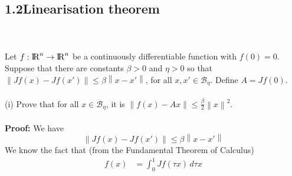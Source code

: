 \documentclass[a4paper,11pt,reqno]{amsart}
\newcommand{\R}{{\rm I\!R}}
\begin{document}
\subsection*{1.2\quad Linearisation theorem}\label{sec:q2}
\
\\ \\
Let $f:\R^n\to\R^n$ be a continuously differentiable function with $f(0)=0$. Suppose that there are constants $\beta>0$ and $\eta>0$ so that $\left\lVert Jf(x)-Jf(x')\right\rVert \leq\beta\left\lVert x-x'\right\rVert $, for all $x, x'\in \mathcal{B}_{\eta}$. Define $A=Jf(0)$.
\\ \\
(i) Prove that for all $x\in \mathcal{B}_{\eta}$, it is $\left\lVert f(x)-Ax\right\rVert \leq \frac{\beta}{2}\left\lVert x\right\rVert ^2$.
\\ \\
\textbf{Proof:} We have
\begin{equation}
    \left\lVert Jf(x)-Jf(x')\right\rVert \leq\beta\left\lVert x-x'\right\rVert 
\end{equation}
We know the fact that (from the Fundamental Theorem of Calculus)
\begin{align}
    f(x)&=\int_{0}^{1}Jf(\tau x)  \,d\tau x 
\end{align}
\end{document}
